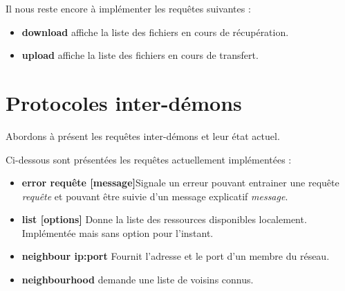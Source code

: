Il nous reste encore à implémenter les requêtes suivantes :
\begin{itemize}

\item{\textbf{download}} affiche la liste des fichiers en cours de récupération.

\item{\textbf{upload}} affiche la liste des fichiers en cours de transfert.

\end{itemize}
	
	\section{Protocoles inter-démons}
		Abordons à présent les requêtes inter-démons et leur état actuel.

        Ci-dessous sont présentées les requêtes actuellement implémentées :
\begin{itemize}
\item{\textbf{error requête [message]}}Signale un erreur pouvant entrainer une requête \textit{requête} et
 pouvant être suivie d'un message explicatif \textit{message}.

\item{\textbf{list [options]}} Donne la liste des ressources disponibles 
localement. Implémentée mais sans option pour l'instant.

\item{\textbf{neighbour ip:port}} Fournit l'adresse et le port d'un membre du 
réseau.

\item{\textbf{neighbourhood}} demande une liste de voisins connus. 

\end{itemize}

\paragraph{} 

